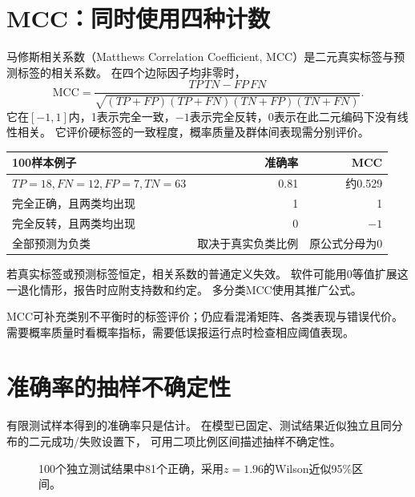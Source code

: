 

\section{MCC：同时使用四种计数}
\label{sec:diag-mcc}
马修斯相关系数（Matthews Correlation Coefficient, MCC）是二元真实标签与预测标签的相关系数。
在四个边际因子均非零时，
\[
 \mathrm{MCC}=\frac{TP\,TN-FP\,FN}
 {\sqrt{(TP+FP)(TP+FN)(TN+FP)(TN+FN)}}.
\]
它在$[-1,1]$内，1表示完全一致，$-1$表示完全反转，0表示在此二元编码下没有线性相关。
它评价硬标签的一致程度，概率质量及群体间表现需分别评价。

\begin{center}
\begin{tabular}{lrr}
\toprule
100样本例子 & 准确率 & MCC\\
\midrule
$TP=18,FN=12,FP=7,TN=63$ & 0.81 & 约0.529\\
完全正确，且两类均出现 & 1 & 1\\
完全反转，且两类均出现 & 0 & $-1$\\
全部预测为负类 & 取决于真实负类比例 & 原公式分母为0\\
\bottomrule
\end{tabular}
\end{center}

若真实标签或预测标签恒定，相关系数的普通定义失效。
软件可能用0等值扩展这一退化情形，报告时应附支持数和约定。
多分类MCC使用其推广公式。

\begin{keyidea}[指标服务于问题]
MCC可补充类别不平衡时的标签评价；仍应看混淆矩阵、各类表现与错误代价。
需要概率质量时看概率指标，需要低误报运行点时检查相应阈值表现。
\end{keyidea}

\section{准确率的抽样不确定性}
\label{sec:diag-uncertainty}
有限测试样本得到的准确率只是估计。
在模型已固定、测试结果近似独立且同分布的二元成功/失败设置下，
可用二项比例区间描述抽样不确定性。

\begin{figure}[htbp]
\centering
\caption{100个独立测试结果中81个正确，采用$z=1.96$的Wilson近似95\%区间。}
\par\smallskip
{}
\end{figure}

